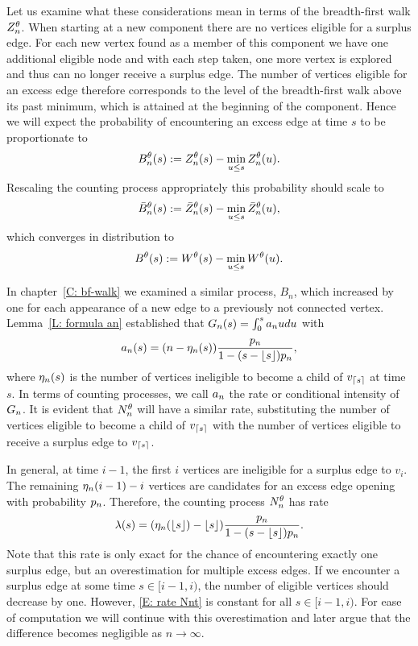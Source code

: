 Let us examine what these considerations mean in terms of the breadth-first walk $Z_n^{\theta}$.
When starting at a new component there are no vertices eligible for a surplus edge.
For each new vertex found as a member of this component we have one additional eligible node 
and with each step taken, one more vertex is explored and thus can no longer receive a surplus edge.
The number of vertices eligible for an excess edge therefore corresponds to the level of the breadth-first walk above its past minimum,
which is attained at the beginning of the component.
Hence we will expect the probability of encountering an excess edge at time $s$ to be proportionate to
\begin{equation}
B_n^{\theta}(s) := Z_n^{\theta}(s) - \min_{u \leq s}Z_n^{\theta}(u).
\end{equation}
Rescaling the counting process appropriately this probability should scale to
\begin{equation}
\bar{B}_n^{\theta}(s) := \bar{Z}^{\theta}_n(s) - \min_{u \leq s}\bar{Z}^{\theta}_n(u),
\end{equation}
which converges in distribution to
\begin{equation}
B^{\theta}(s) := W^{\theta}(s) - \min_{u \leq s}W^{\theta}(u). 
\end{equation}

In chapter~\ref{C: bf-walk} we examined a similar process, $B_n$, 
which increased by one for each appearance of a new edge to a previously not connected vertex.
Lemma~\ref{L: formula an} established that $G_n(s) = \int_{0}^{s} a_n{u}du$ with
\begin{equation*}
	a_n(s) = (n - \eta_n(s)) \frac{p_n}{1-(s-\lfloor s\rfloor)p_n},
\end{equation*}
where $\eta_n(s)$ is the number of vertices ineligible to become a child of $v_{\lceil s\rceil}$ at time $s$.
In terms of counting processes, we call $a_n$ the rate or conditional intensity of $G_n$.
It is evident that $N_n^{\theta}$ will have a similar rate,
substituting the number of vertices eligible to become a child of $v_{\lceil s\rceil}$ with the number of vertices eligible to receive a surplus edge to $v_{\lceil s\rceil}$.

In general, at time $i-1$, the first $i$ vertices are ineligible for a surplus edge to $v_i$.
The remaining $\eta_n(i-1) - i$ vertices are candidates for an excess edge opening with probability $p_n$.
Therefore, the counting process $N_n^{\theta}$ has rate
\begin{equation} \label{E: rate Nnt}
\lambda(s) = (\eta_n(\lfloor s\rfloor) - \lfloor s\rfloor) \frac{p_n}{1-(s-\lfloor s\rfloor)p_n}.
\end{equation}
Note that this rate is only exact for the chance of encountering exactly one surplus edge, 
but an overestimation for multiple excess edges.
If we encounter a surplus edge at some time $s \in [i-1, i)$,
the number of eligible vertices should decrease by one.
However, \eqref{E: rate Nnt} is constant for all $s \in [i-1, i)$.
For ease of computation we will continue with this overestimation and later argue that the difference becomes negligible as $n \rightarrow \infty$.

